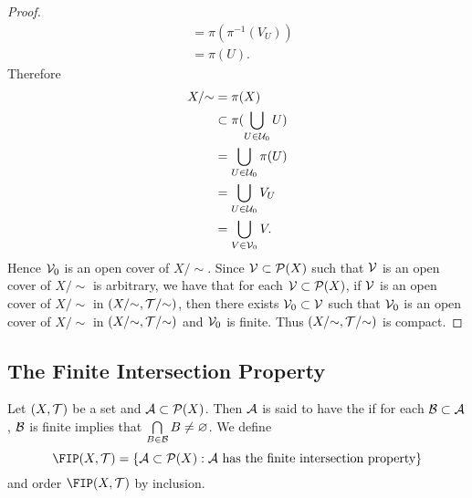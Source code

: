 \documentclass{book}
\begin{document}
\begin{proof}
\begin{align*}
			& = \pi(\pi^{-1}(V_U)) \\
			& = \pi(U).
		\end{align*}
		Therefore 
		\begin{align*}
			X/{\sim}
			& = \pi(X) \\
			& \subset \pi(\bigcup\limits_{U \in \mathcal{U}_0} U) \\
			& = \bigcup\limits_{U \in \mathcal{U}_0} \pi(U) \\
			& = \bigcup\limits_{U \in \mathcal{U}_0} V_U \\
			& = \bigcup\limits_{V \in \mathcal{V}_0} V.
		\end{align*} 
		Hence $\mathcal{V}_0$ is an open cover of $X/{\sim}$. Since $\mathcal{V} \subset \mathcal{P}(X)$ such that $\mathcal{V}$ is an open cover of $X/{\sim}$ is arbitrary, we have that for each $\mathcal{V} \subset \mathcal{P}(X)$, if $\mathcal{V}$ is an open cover of $X/{\sim}$ in $(X/{\sim}, \mathcal{T}/{\sim})$, then there exists $\mathcal{V}_0 \subset \mathcal{V}$ such that $\mathcal{V}_0$ is an open cover of $X/{\sim}$ in $(X/{\sim}, \mathcal{T}/{\sim})$ and $\mathcal{V}_0$ is finite. Thus $(X/{\sim}, \mathcal{T}/{\sim})$ is compact.
	\end{proof}

	
	
	
	
	
	
	
	
	
	
	
	
	
	
	
	
		

	






















	\subsection{The Finite Intersection Property} 
	
	\begin{defn} 
		Let $(X, \mathcal{T})$ be a set and $\mathcal{A} \subset \mathcal{P}(X)$. Then $\mathcal{A}$ is said to have the  if for each $\mathcal{B} \subset \mathcal{A}$, $\mathcal{B}$ is finite implies that $\bigcap\limits_{B \in \mathcal{B}} B \neq \varnothing$. We define 
		$$\FIP(X, \MT) = \{\MA \subset \MP(X): \MA \text{ has the finite intersection property} \}$$ 
		and order $\FIP(X, \MT)$ by inclusion. 
	\end{defn}
\end{document}
